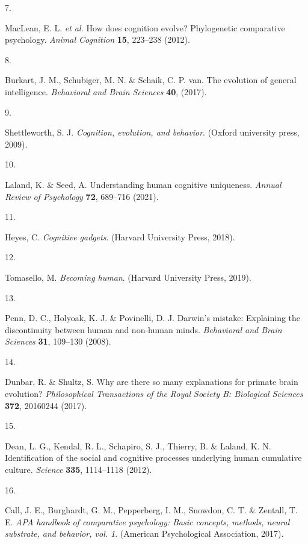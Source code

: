 \documentclass[
  man,floatsintext]{apa6}
\newlength{\cslhangindent}
\newlength{\csllabelwidth}
\newlength{\cslentryspacingunit} %
\newenvironment{CSLReferences}[2] %
 {%
  \setlength{\parindent}{0pt}
  \ifodd #1
  \let\oldpar\par
  \def\par{\hangindent=\cslhangindent\oldpar}
  \fi
  \setlength{\parskip}{#2\cslentryspacingunit}
 }%
 {}
\newcommand{\CSLLeftMargin}[1]{\parbox[t]{\csllabelwidth}{#1}}
\newcommand{\CSLRightInline}[1]{\parbox[t]{\linewidth - \csllabelwidth}{#1}\break}
\begin{document}
\begin{CSLReferences}{0}{0}
\leavevmode{}%
\CSLLeftMargin{7. }%
\CSLRightInline{MacLean, E. L. \emph{et al.} How does cognition evolve? Phylogenetic comparative psychology. \emph{Animal Cognition} \textbf{15}, 223--238 (2012).}

\leavevmode{}%
\CSLLeftMargin{8. }%
\CSLRightInline{Burkart, J. M., Schubiger, M. N. \& Schaik, C. P. van. The evolution of general intelligence. \emph{Behavioral and Brain Sciences} \textbf{40}, (2017).}

\leavevmode{}%
\CSLLeftMargin{9. }%
\CSLRightInline{Shettleworth, S. J. \emph{Cognition, evolution, and behavior}. (Oxford university press, 2009).}

\leavevmode{}%
\CSLLeftMargin{10. }%
\CSLRightInline{Laland, K. \& Seed, A. Understanding human cognitive uniqueness. \emph{Annual Review of Psychology} \textbf{72}, 689--716 (2021).}

\leavevmode{}%
\CSLLeftMargin{11. }%
\CSLRightInline{Heyes, C. \emph{Cognitive gadgets}. (Harvard University Press, 2018).}

\leavevmode{}%
\CSLLeftMargin{12. }%
\CSLRightInline{Tomasello, M. \emph{Becoming human}. (Harvard University Press, 2019).}

\leavevmode{}%
\CSLLeftMargin{13. }%
\CSLRightInline{Penn, D. C., Holyoak, K. J. \& Povinelli, D. J. Darwin's mistake: Explaining the discontinuity between human and non-human minds. \emph{Behavioral and Brain Sciences} \textbf{31}, 109--130 (2008).}

\leavevmode{}%
\CSLLeftMargin{14. }%
\CSLRightInline{Dunbar, R. \& Shultz, S. Why are there so many explanations for primate brain evolution? \emph{Philosophical Transactions of the Royal Society B: Biological Sciences} \textbf{372}, 20160244 (2017).}

\leavevmode{}%
\CSLLeftMargin{15. }%
\CSLRightInline{Dean, L. G., Kendal, R. L., Schapiro, S. J., Thierry, B. \& Laland, K. N. Identification of the social and cognitive processes underlying human cumulative culture. \emph{Science} \textbf{335}, 1114--1118 (2012).}

\leavevmode{}%
\CSLLeftMargin{16. }%
\CSLRightInline{Call, J. E., Burghardt, G. M., Pepperberg, I. M., Snowdon, C. T. \& Zentall, T. E. \emph{APA handbook of comparative psychology: Basic concepts, methods, neural substrate, and behavior, vol. 1}. (American Psychological Association, 2017).}


\end{CSLReferences}
\end{document}
